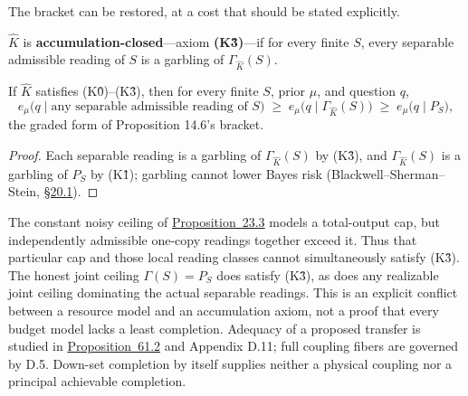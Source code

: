 The bracket can be restored, at a cost that should be stated explicitly.

\begin{thmdef}

\(\widehat K\) is \textbf{accumulation-closed}---\hspace{0pt}axiom \textbf{(K3̂)}---\hspace{0pt}if for every finite \(S\), every separable admissible reading of \(S\) is a garbling of \(\Gamma_{\widehat K}(S)\).
\end{thmdef}

\begin{thmplain}

If \(\widehat K\) satisfies (K0̂)--(K3̂), then for every finite \(S\), prior \(\mu\), and question \(q\),
\[
e_\mu\big(q \mid \text{any separable admissible reading of } S\big)
\;\ge\;
e_\mu\big(q \mid \Gamma_{\widehat K}(S)\big)
\;\ge\;
e_\mu\big(q \mid P_S\big),
\]
the graded form of Proposition 14.6's bracket.
\end{thmplain}

\begin{proof}

Each separable reading is a garbling of \(\Gamma_{\widehat K}(S)\) by (K3̂), and \(\Gamma_{\widehat K}(S)\) is a garbling of \(P_S\) by (K1̂); garbling cannot lower Bayes risk (Blackwell--Sherman--Stein, \hyperlink{sec:20.1}{§20.1}).
\end{proof}

\begin{thmrem}

The constant noisy ceiling of \hyperlink{stmt:23.3}{Proposition~23.3} models a total-output cap, but independently admissible one-copy readings together exceed it. Thus that particular cap and those local reading classes cannot simultaneously satisfy (K3̂). The honest joint ceiling \(\Gamma(S)=P_S\) does satisfy (K3̂), as does any realizable joint ceiling dominating the actual separable readings. This is an explicit conflict between a resource model and an accumulation axiom, not a proof that every budget model lacks a least completion. Adequacy of a proposed transfer is studied in \hyperlink{stmt:61.2}{Proposition~61.2} and Appendix D.11; full coupling fibers are governed by D.5. Down-set completion by itself supplies neither a physical coupling nor a principal achievable completion.
\end{thmrem}

